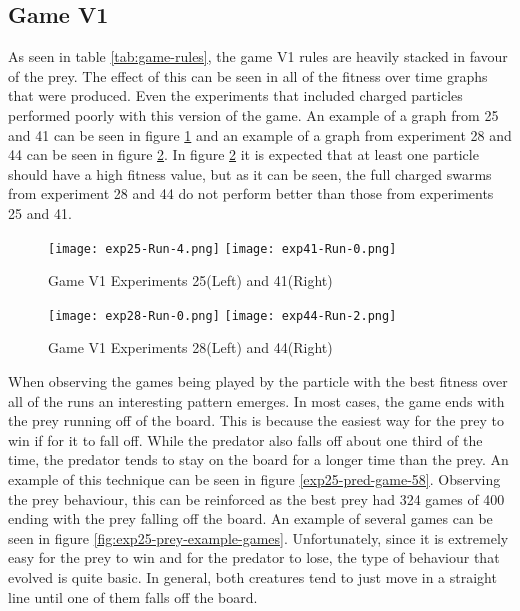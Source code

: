 \subsection{Game V1}
As seen in table \ref{tab:game-rules}, the game V1 rules are heavily stacked in favour of the prey. The effect of this can be seen in all of the fitness over time graphs that were produced. Even the experiments that included charged particles performed poorly with this version of the game. An example of a graph from 25 and 41 can be seen in figure \ref{fig:v1-no-charged-graphs} and an example of a graph from experiment 28 and 44 can be seen in figure \ref{fig:v1-fully-charged-graphs}. In figure \ref{fig:v1-fully-charged-graphs} it is expected that at least one particle should have a high fitness value, but as it can be seen, the full charged swarms from experiment 28 and 44 do not perform better than those from experiments 25 and 41.

\begin{figure}
  \centering
  \texttt{[image: exp25-Run-4.png]}  \texttt{[image: exp41-Run-0.png]}
  \caption{Game V1 Experiments 25(Left) and 41(Right)}
  \label{fig:v1-no-charged-graphs}
\end{figure}


\begin{figure}
  \centering
  \texttt{[image: exp28-Run-0.png]}  \texttt{[image: exp44-Run-2.png]}
  \caption{Game V1 Experiments 28(Left) and 44(Right)}
  \label{fig:v1-fully-charged-graphs}
\end{figure}

When observing the games being played by the particle with the best fitness over all of the runs an interesting pattern emerges. In most cases, the game ends with the prey running off of the board. This is because the easiest way for the prey to win if for it to fall off. While the predator also falls off about one third of the time, the predator tends to stay on the board for a longer time than the prey. An example of this technique can be seen in figure \ref{exp25-pred-game-58}. Observing the prey behaviour, this can be reinforced as the best prey had 324 games of 400 ending with the prey falling off the board. An example of several games can be seen in figure \ref{fig:exp25-prey-example-games}. Unfortunately, since it is extremely easy for the prey to win and for the predator to lose, the type of behaviour that evolved is quite basic. In general, both creatures tend to just move in a straight line until one of them falls off the board.


